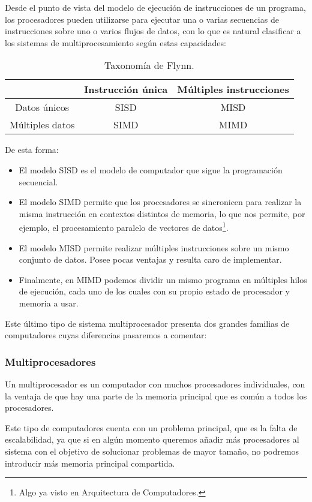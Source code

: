 Desde el punto de vista del modelo de ejecución de instrucciones de un programa, los procesadores pueden utilizarse para ejecutar una o varias secuencias de instrucciones sobre uno o varios flujos de datos, con lo que es natural clasificar a los sistemas de multiprocesamiento según estas capacidades:
\begin{table}[H]
\centering
\begin{tabular}{|c|c|c|}
    \hline
    & Instrucción única & Múltiples instrucciones \\
    \hline
    Datos únicos & SISD & MISD \\
    \hline
    Múltiples datos & SIMD & MIMD \\
    \hline
\end{tabular}
\caption{Taxonomía de Flynn.}
\end{table}
De esta forma:
\begin{itemize}
    \item El modelo SISD es el modelo de computador que sigue la programación secuencial.
    \item El modelo SIMD permite que los procesadores se sincronicen para realizar la misma instrucción en contextos distintos de memoria, lo que nos permite, por ejemplo, el procesamiento paralelo de vectores de datos\footnote{Algo ya visto en Arquitectura de Computadores.}.
    \item El modelo MISD permite realizar múltiples instrucciones sobre un mismo conjunto de datos. Posee pocas ventajas y resulta caro de implementar.
    \item Finalmente, en MIMD podemos dividir un mismo programa en múltiples hilos de ejecución, cada uno de los cuales con su propio estado de procesador y memoria a usar.
\end{itemize}
Este último tipo de sistema multiprocesador presenta dos grandes familias de computadores cuyas diferencias pasaremos a comentar:

\subsubsection{Multiprocesadores}
Un multiprocesador es un computador con muchos procesadores individuales, con la ventaja de que hay una parte de la memoria principal que es común a todos los procesadores.

Este tipo de computadores cuenta con un problema principal, que es la falta de escalabilidad, ya que si en algún momento queremos añadir más procesadores al sistema con el objetivo de solucionar problemas de mayor tamaño, no podremos introducir más memoria principal compartida.\\

